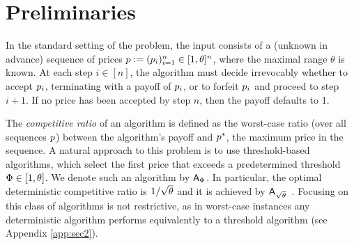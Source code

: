 \section{Preliminaries}
\label{sec:preliminaries}

In the standard setting of the \OMS{} problem, the input consists of a (unknown in advance) sequence of prices
$p:=(p_i)_{i=1}^n \in [1,\theta]^n$, where the maximal range $\theta$ is known. At each step $i \in [n]$, the algorithm must decide irrevocably whether to accept $p_i$, terminating with a payoff of $p_i$, or to forfeit $p_i$ and proceed to step $i+1$. If no price has been accepted by step $n$, then the payoff defaults to 1. 

The {\em competitive ratio} of an algorithm is defined as the worst-case ratio (over all sequences $p$) between the algorithm's payoff and $p^*$, the maximum price in the sequence. 
A natural approach to this problem is to use threshold-based algorithms, which select the first price that exceeds a predetermined threshold $\Phi \in [1,\theta]$. We denote such an algorithm by $\mbox{\textup{\textsf{A}}}_\Phi$. In particular,
the optimal deterministic competitive ratio is $1/\sqrt{\theta}$ and it is achieved by $\mbox{\textup{\textsf{A}}}_{\sqrt{\theta}}$~\cite{el-yaniv_competitive_1998}. Focusing on this class of algorithms is not restrictive, as in worst-case instances any deterministic algorithm performs equivalently to a threshold algorithm (see Appendix \ref{app:sec2}).

